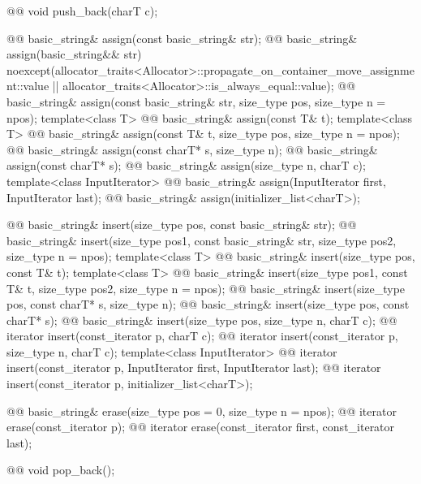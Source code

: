 \documentclass{wg21}
\begin{document}
\begin{codeblock}
{{    @@ void push_back(charT c);

    @@ basic_string& assign(const basic_string& str);
    @@ basic_string& assign(basic_string&& str)
      noexcept(allocator_traits<Allocator>::propagate_on_container_move_assignment::value ||
               allocator_traits<Allocator>::is_always_equal::value);
    @@ basic_string& assign(const basic_string& str, size_type pos, size_type n = npos);
    template<class T>
      @@ basic_string& assign(const T& t);
    template<class T>
      @@ basic_string& assign(const T& t, size_type pos, size_type n = npos);
    @@ basic_string& assign(const charT* s, size_type n);
    @@ basic_string& assign(const charT* s);
    @@ basic_string& assign(size_type n, charT c);
    template<class InputIterator>
      @@ basic_string& assign(InputIterator first, InputIterator last);
    @@ basic_string& assign(initializer_list<charT>);

    @@ basic_string& insert(size_type pos, const basic_string& str);
    @@ basic_string& insert(size_type pos1, const basic_string& str,
                                             size_type pos2, size_type n = npos);
    template<class T>
      @@ basic_string& insert(size_type pos, const T& t);
    template<class T>
      @@ basic_string& insert(size_type pos1, const T& t, size_type pos2, size_type n = npos);
    @@ basic_string& insert(size_type pos, const charT* s, size_type n);
    @@ basic_string& insert(size_type pos, const charT* s);
    @@ basic_string& insert(size_type pos, size_type n, charT c);
    @@ iterator insert(const_iterator p, charT c);
    @@ iterator insert(const_iterator p, size_type n, charT c);
    template<class InputIterator>
      @@ iterator insert(const_iterator p, InputIterator first, InputIterator last);
    @@ iterator insert(const_iterator p, initializer_list<charT>);

    @@ basic_string& erase(size_type pos = 0, size_type n = npos);
    @@ iterator erase(const_iterator p);
    @@ iterator erase(const_iterator first, const_iterator last);

    @@ void pop_back();

}}
\end{codeblock}
\end{document}
